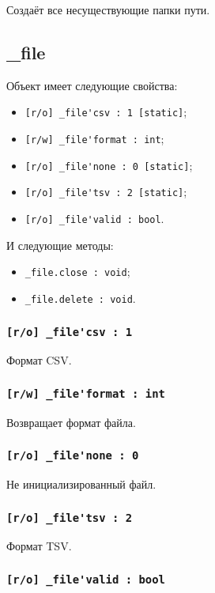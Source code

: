 \documentclass[a4paper, 14pt]{extarticle}
\newenvironment{icItems}
	{ \begin{itemize} [noitemsep,nolistsep] }
	{ \end{itemize} }
\begin{document}
Создаёт все несуществующие папки пути.

\subsection{{\color{orange} \_file}}

Объект \file{} имеет следующие свойства:
\begin{icItems}
	\item \lstinline|[r/o] _file'csv : 1 [static]|;
	\item \lstinline|[r/w] _file'format : int|;
	\item \lstinline|[r/o] _file'none : 0 [static]|;
	\item \lstinline|[r/o] _file'tsv : 2 [static]|;
	\item \lstinline|[r/o] _file'valid : bool|.
\end{icItems}

И следующие методы:
\begin{icItems}
	\item \lstinline|_file.close : void|;
	\item \lstinline|_file.delete : void|.
\end{icItems}

\subsubsection{\lstinline|[r/o] _file'csv : 1|}

Формат CSV.

\subsubsection{\lstinline|[r/w] _file'format : int|}

Возвращает формат файла.

\subsubsection{\lstinline|[r/o] _file'none : 0|}

Не инициализированный файл.

\subsubsection{\lstinline|[r/o] _file'tsv : 2|}

Формат TSV.

\subsubsection{\lstinline|[r/o] _file'valid : bool|}
\end{document}
